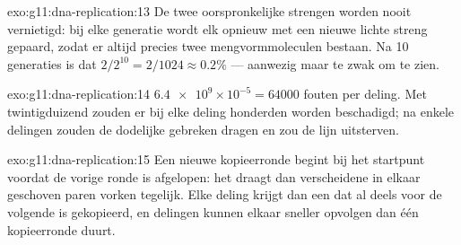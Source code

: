 \begin{solution}{exo:g11:dna-replication:13}
De twee oorspronkelijke strengen worden nooit vernietigd: bij elke
generatie wordt elk opnieuw met een nieuwe lichte streng gepaard, zodat
er altijd precies twee mengvormmoleculen bestaan. Na 10 generaties is dat
$2/2^{10} = 2/1024
\approx 0.2\%$ --- aanwezig maar te zwak om te zien.
\end{solution}

\begin{solution}{exo:g11:dna-replication:14}
$\num{6.4e9} \times 10^{-5} = \num{64000}$ fouten per deling. Met
twintigduizend  zouden er bij elke deling honderden  worden
beschadigd; na enkele delingen zouden de  dodelijke gebreken dragen
en zou de lijn uitsterven.
\end{solution}

\begin{solution}{exo:g11:dna-replication:15}
Een nieuwe kopieerronde begint bij het startpunt voordat de vorige ronde
is afgelopen: het  draagt dan verscheidene in elkaar geschoven
paren vorken tegelijk. Elke deling krijgt dan een  dat al deels
voor de volgende is gekopieerd, en delingen kunnen elkaar sneller opvolgen
dan één kopieerronde duurt.
\end{solution}

